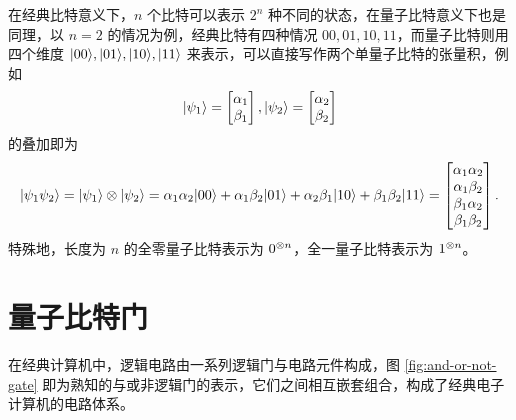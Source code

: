 在经典比特意义下，$n$ 个比特可以表示 $2^n$ 种不同的状态，在量子比特意义下也是同理，以 $n=2$ 的情况为例，经典比特有四种情况 $00,01,10,11$，而量子比特则用四个维度 $|00\rangle,|01\rangle,|10\rangle,|11\rangle$ 来表示，可以直接写作两个单量子比特的张量积，例如
\begin{align}\begin{aligned}
        |\psi_1\rangle=\begin{bmatrix}
                         \alpha_1 \\\beta_1
                     \end{bmatrix},
        |\psi_2\rangle=\begin{bmatrix}
                         \alpha_2 \\\beta_2
                     \end{bmatrix}
    \end{aligned}\end{align}
的叠加即为
\begin{align}\begin{aligned}
        |\psi_1\psi_2\rangle=|\psi_1\rangle\otimes|\psi_2\rangle=\alpha_1\alpha_2|00\rangle+\alpha_1\beta_2|01\rangle+\alpha_2\beta_1|10\rangle+\beta_1\beta_2|11\rangle=
        \begin{bmatrix}
            \alpha_1\alpha_2 \\\alpha_1\beta_2\\\beta_1\alpha_2\\\beta_1\beta_2
        \end{bmatrix}.
    \end{aligned}\end{align}
特殊地，长度为 $n$ 的全零量子比特表示为 $0^{\otimes n}$，全一量子比特表示为 $1^{\otimes n}$。

\section{量子比特门}

在经典计算机中，逻辑电路由一系列逻辑门与电路元件构成，图 \ref{fig:and-or-not-gate} 即为熟知的与或非逻辑门的表示，它们之间相互嵌套组合，构成了经典电子计算机的电路体系。

